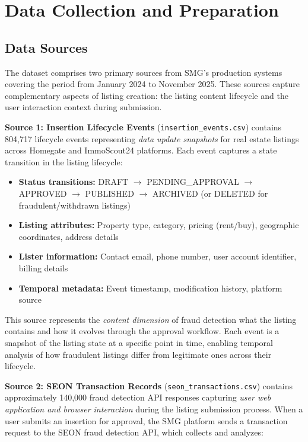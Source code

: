 \section{Data Collection and Preparation}
\label{sec:3_2}

\subsection{Data Sources}

The dataset comprises two primary sources from SMG's production systems covering the period from January 2024 to November 2025. These sources capture complementary aspects of listing creation: the listing content lifecycle and the user interaction context during submission.

\textbf{Source 1: Insertion Lifecycle Events} (\texttt{insertion\_events.csv}) contains 804,717 lifecycle events representing \emph{data update snapshots} for real estate listings across Homegate and ImmoScout24 platforms. Each event captures a state transition in the listing lifecycle:

\begin{itemize}
    \item \textbf{Status transitions:} DRAFT $\rightarrow$ PENDING\_APPROVAL $\rightarrow$ APPROVED $\rightarrow$ PUBLISHED $\rightarrow$ ARCHIVED (or DELETED for fraudulent/withdrawn listings)
    \item \textbf{Listing attributes:} Property type, category, pricing (rent/buy), geographic coordinates, address details
    \item \textbf{Lister information:} Contact email, phone number, user account identifier, billing details
    \item \textbf{Temporal metadata:} Event timestamp, modification history, platform source
\end{itemize}

This source represents the \emph{content dimension} of fraud detection what the listing contains and how it evolves through the approval workflow. Each event is a snapshot of the listing state at a specific point in time, enabling temporal analysis of how fraudulent listings differ from legitimate ones across their lifecycle.

\textbf{Source 2: SEON Transaction Records} (\texttt{seon\_transactions.csv}) contains approximately 140,000 fraud detection API responses capturing \emph{user web application and browser interaction} during the listing submission process. When a user submits an insertion for approval, the SMG platform sends a transaction request to the SEON fraud detection API, which collects and analyzes:

